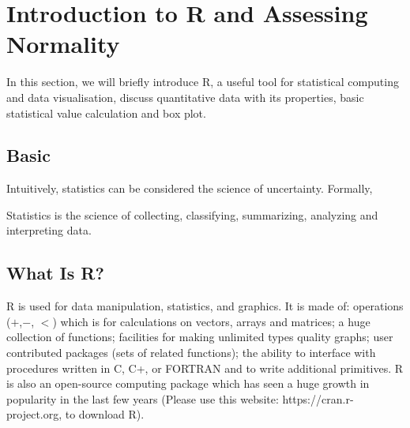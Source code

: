 \chapter{Introduction to R and Assessing Normality}
\label{sec.matrix}
\pagestyle{myheadings}  

In this section, we will briefly introduce R, a useful tool for statistical computing and data visualisation, discuss quantitative data with its properties, basic statistical value calculation and box plot.\\

\section{Basic}


Intuitively, statistics can be considered the science of uncertainty. Formally,

\begin{definition}[Statistics]	
Statistics is the science of collecting, classifying, summarizing, analyzing and interpreting data.
\end{definition}

\section{What Is R?}

R is used for data manipulation, statistics, and graphics. It is made of: operations ($+$,$ -$, $<$) which is for calculations on vectors, arrays and matrices; a huge collection of functions; facilities for making unlimited types quality graphs; user contributed packages (sets of related functions); the ability to interface with procedures written in C, C+, or FORTRAN and to write additional primitives. R is also an open-source computing package which has seen a huge growth in popularity in the last few years (Please use this website: https://cran.r-project.org, to download R).
\\

\bigbreak

